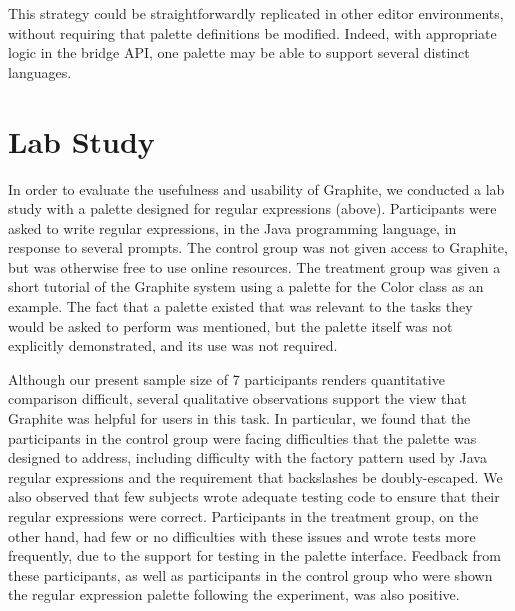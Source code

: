 \documentclass[conference]{IEEEtran}
\begin{document}
This strategy could be straightforwardly replicated in other editor environments, without requiring that palette definitions be modified. Indeed, with appropriate logic in the bridge API, one palette may be able to support several distinct languages.

\section{Lab Study}

In order to evaluate the usefulness and usability of Graphite, we conducted a lab study with a palette designed for regular expressions (above). Participants were asked to write regular expressions, in the Java programming language, in response to several prompts. The control group was not given access to Graphite, but was otherwise free to use online resources. The treatment group was given a short tutorial of the Graphite system using a palette for the Color class as an example. The fact that a palette existed that was relevant to the tasks they would be asked to perform was mentioned, but the palette itself was not explicitly demonstrated, and its use was not required.

Although our present sample size of 7 participants renders quantitative comparison difficult, several qualitative observations support the view that Graphite was helpful for users in this task. In particular, we found that the participants in the control group were facing difficulties that the palette was designed to address, including difficulty with the factory pattern used by Java regular expressions and the requirement that backslashes be doubly-escaped. We also observed that few subjects wrote adequate testing code to ensure that their regular expressions were correct. Participants in the treatment group, on the other hand, had few or no difficulties with these issues and wrote tests more frequently, due to the support for testing in the palette interface. Feedback from these participants, as well as participants in the control group who were shown the regular expression palette following the experiment, was also positive.



%
%
%
%
%
\end{document}
